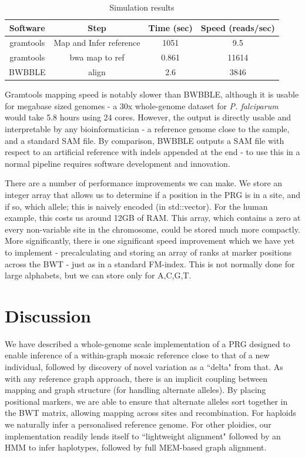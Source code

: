 \documentclass[runningheads,a4paper]{llncs}
\begin{document}
\begin{table}
\caption{Simulation results }
\centering
\begin{tabular}{c c c c}
\hline
Software  & Step & Time (sec) & Speed (reads/sec)\\
\hline
gramtools & Map and Infer reference &  1051 & 9.5 \\
gramtools & bwa map to ref & 0.861  & 11614 \\
BWBBLE  & align & 2.6 & 3846 \\ 
\hline
\end{tabular}
\end{table}

Gramtools mapping speed is notably slower than BWBBLE, although it is usable for megabase sized genomes - a 30x whole-genome dataset for \textit{P. falciparum} would take 5.8 hours using 24 cores. However, the output is directly usable and interpretable by any bioinformatician - a reference genome close to the sample, and a standard SAM file. By comparison, BWBBLE outputs a SAM file with respect to an artificial reference with indels appended at the end - to use this in a normal pipeline requires software development and innovation.

There are a number of performance improvements we can make. We store an integer array that allows us to determine if a position in the PRG is in a site, and if so, which allele; this is naively encoded (in std::vector). For the human example, this costs us around 12GB of RAM. This  array, which contains a zero at every non-variable site in the chromosome, could be stored much more compactly. More significantly, there is one significant speed improvement which we have yet to implement - precalculating and storing an array of ranks at marker positions across the BWT - just as in a standard FM-index. This is not normally done for large alphabets, but we can store only for A,C,G,T. 

\section{Discussion}
We have described a whole-genome scale implementation of a PRG designed to enable inference of a within-graph mosaic reference close to that of a new individual, followed by discovery of novel variation as a ``delta" from that. As with any reference graph approach, there is an implicit coupling between mapping and graph structure (for handling alternate alleles). By placing positional markers, we are able to ensure that alternate alleles sort together in the BWT matrix, allowing mapping across sites and recombination. For haploids we naturally infer a personalised reference genome. For other ploidies, our implementation readily lends itself to ``lightweight alignment" \cite{sailfish,rapmap,kallisto} followed by an HMM to infer haplotypes, followed by full MEM-based graph alignment.  
\end{document}
